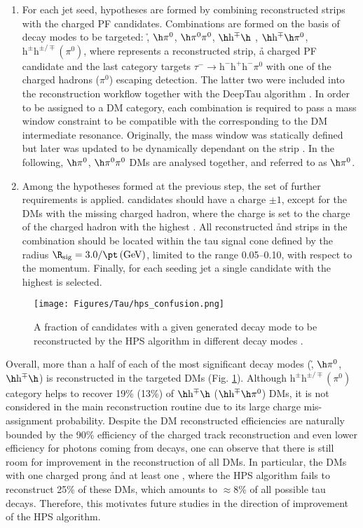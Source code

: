 \begin{enumerate}
    \item For each jet seed, \tauh hypotheses are formed by combining reconstructed strips with the charged PF candidates. Combinations are formed on the basis of decay modes to be targeted: \h, $\h \pi^0$, $\h \pi^0 \pi^0$, $\h \text{h}^\mp \h$ , $\h \text{h}^\mp \h \pi^0$, $\text{h}^\pm\text{h}^{\pm/\mp} (\pi^0)$, where \piz represents a reconstructed strip, \h a charged PF candidate and the last category targets $\tau^- \to \text{h}^- \text{h}^+ \text{h}^- \pi^0$ with one of the charged hadrons ($\pi^0$) escaping detection. The latter two were included into the reconstruction workflow together with the DeepTau algorithm \cite{CMS:2022prd}. In order to be assigned to a DM category, each combination is required to pass a mass window constraint to be compatible with the corresponding to the DM intermediate resonance. Originally, the mass window was statically defined but later was updated to be dynamically dependant on the strip \pt. In the following, $\h \pi^0$, $\h \pi^0 \pi^0$ DMs are analysed together, and referred to as $\h \pi^0$. 
    \item Among the \tauh hypotheses formed at the previous step, the set of further requirements is applied. \tauh candidates should  have a charge $\pm 1$, except for the DMs with the missing charged hadron, where the \tauh charge is set to the charge of the charged hadron with the highest \pt. All reconstructed \h and strips in the combination should be located within the tau signal cone defined by the radius $\R_\text{sig} = 3.0 / \pt \, \text{(GeV)}$, limited to the range 0.05–0.10, with respect to the \tauh momentum. Finally, for each seeding jet a single \tauh candidate with the highest \pt is selected.
    \end{enumerate}

\begin{figure}[t!]
    \centering
    \texttt{[image: Figures/Tau/hps\_confusion.png]}
    \caption{A fraction of \tauh candidates with a given generated decay mode to be reconstructed by the HPS algorithm in different decay modes \cite{CMS:2022prd}.}
    \label{fig:hps_confusion_matrix}
\end{figure}

Overall, more than a half of each of the most significant \tauh decay modes (\h, $\h \pi^0$, $\h \text{h}^\mp \h$) is reconstructed in the targeted DMs (Fig. \ref{fig:hps_confusion_matrix}). Although $\text{h}^\pm\text{h}^{\pm/\mp} (\pi^0)$ category helps to recover 19\% (13\%) of $\h \text{h}^\mp \h$ ($\h \text{h}^\mp \h \pi^0$) DMs, it is not considered in the main \tauh reconstruction routine due to its large charge mis-assignment probability. Despite the DM reconstructed efficiencies are naturally bounded by the 90\% efficiency of the charged track reconstruction and even lower efficiency for photons coming from \piz decays, one can observe that there is still room for improvement in the reconstruction of all DMs. In particular, the DMs with one charged prong \h and at least one \piz, where the HPS algorithm fails to reconstruct 25\% of these DMs, which amounts to $\approx$8\% of all possible tau decays. Therefore, this motivates future studies in the direction of improvement of the HPS algorithm.

